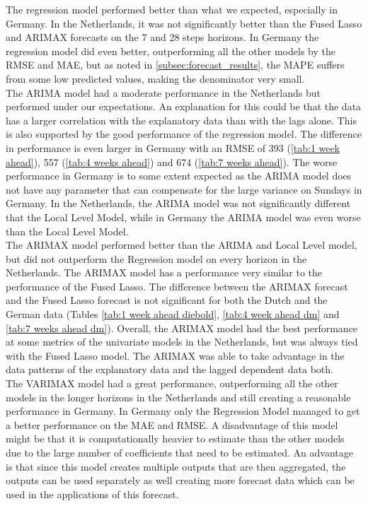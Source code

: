 The regression model performed better than what we expected, especially in Germany. In the Netherlands, it was not significantly better than the Fused Lasso and ARIMAX forecasts on the 7 and 28 steps horizons. In Germany the regression model did even better, outperforming all the other models by the RMSE and MAE, but as noted in \autoref{subsec:forecast_results}, the MAPE suffers from some low predicted values, making the denominator very small.\\

The ARIMA model had a moderate performance in the Netherlands but performed under our expectations. An explanation for this could be that the data has a larger correlation with the explanatory data than with the lags alone. This is also supported by the good performance of the regression model. The difference in performance is even larger in Germany with an RMSE of 393 (\autoref{tab:1 week ahead}), 557 (\autoref{tab:4 weeks ahead}) and 674 (\autoref{tab:7 weeks ahead}). The worse performance in Germany is to some extent expected as the ARIMA model does not have any parameter that can compensate for the large variance on Sundays in Germany. In the Netherlands, the ARIMA model was not significantly different that the Local Level Model, while in Germany the ARIMA model was even worse than the Local Level Model.\\

The ARIMAX model performed better than the ARIMA and Local Level model, but did not outperform the Regression model on every horizon in the Netherlands. The ARIMAX model has a performance very similar to the performance of the Fused Lasso. The difference between the ARIMAX forecast and the Fused Lasso forecast is not significant for both the Dutch and the German data (Tables \ref{tab:1 week ahead diebold}, \ref{tab:4 week ahead dm} and \ref{tab:7 weeks ahead dm}). Overall, the ARIMAX model had the best performance at some metrics of the univariate models in the Netherlands, but was always tied with the Fused Lasso model. The ARIMAX was able to take advantage in the data patterns of the explanatory data and the lagged dependent data both.\\

The VARIMAX model had a great performance, outperforming all the other models in the longer horizons in the Netherlands and still creating a reasonable performance in Germany. In Germany only the Regression Model managed to get a better performance on the MAE and RMSE. A disadvantage of this model might be that it is computationally heavier to estimate than the other models due to the large number of coefficients that need to be estimated. An advantage is that since this model creates multiple outputs that are then aggregated, the outputs can be used separately as well creating more forecast data which can be used in the applications of this forecast.\\

